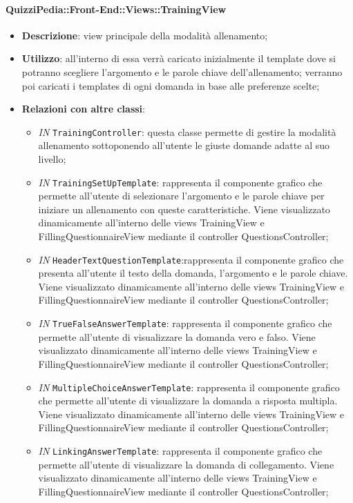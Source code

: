 \paragraph{QuizziPedia::Front-End::Views::TrainingView}
\begin{itemize}
	\item \textbf{Descrizione}: view principale della modalità allenamento;
	\item \textbf{Utilizzo}: all'interno di essa verrà caricato inizialmente il template dove si potranno scegliere l'argomento e le parole chiave dell'allenamento; verranno poi caricati i templates di ogni domanda in base alle preferenze scelte; 
	\item \textbf{Relazioni con altre classi}:
	\begin{itemize}
		\item \textit{IN} \texttt{TrainingController}: questa classe permette di gestire la modalità allenamento sottoponendo all'utente le giuste domande adatte al suo livello;
		\item \textit{IN} \texttt{TrainingSetUpTemplate}: rappresenta il componente grafico che permette all'utente di selezionare l'argomento e le parole chiave per iniziare un allenamento con queste caratteristiche. Viene visualizzato	dinamicamente all'interno delle views TrainingView e FillingQuestionnaireView mediante il controller QuestionsController;
		\item \textit{IN} \texttt{HeaderTextQuestionTemplate}:rappresenta il componente grafico che presenta all'utente il testo della domanda, l'argomento e le parole chiave. Viene visualizzato dinamicamente all'interno delle views TrainingView e FillingQuestionnaireView mediante il controller QuestionsController;
		\item \textit{IN} \texttt{TrueFalseAnswerTemplate}: rappresenta il componente grafico che permette all'utente di visualizzare la domanda vero e falso. Viene visualizzato dinamicamente all'interno delle views TrainingView e FillingQuestionnaireView mediante il controller QuestionsController;
		\item \textit{IN} \texttt{MultipleChoiceAnswerTemplate}: rappresenta il componente grafico che permette all'utente di visualizzare la domanda a risposta multipla. Viene visualizzato dinamicamente all'interno delle views TrainingView e FillingQuestionnaireView mediante il controller QuestionsController;
		\item \textit{IN} \texttt{LinkingAnswerTemplate}: rappresenta il componente grafico che permette all'utente di visualizzare la domanda di collegamento. Viene visualizzato dinamicamente all'interno delle views TrainingView e FillingQuestionnaireView mediante il controller QuestionsController;

\end{itemize}
\end{itemize}
